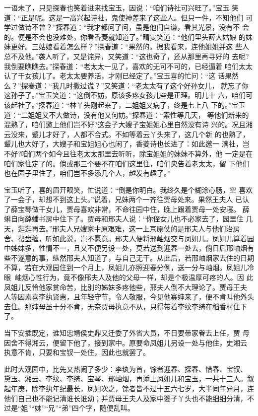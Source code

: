 一语未了，只见探春也笑着进来找宝玉，因说：“咱们诗社可兴旺了。”宝玉
笑道：“正是呢。这是一高兴起诗社，鬼使神差来了这些人。但只一件，不知他们
可学过做诗不曾？”探春道：“我才都问了问，虽是他们自谦，看其光景，没有不
会的。便是不会也没难处，你看香菱就知道了。”晴雯笑道：“他们里头薛大姑娘
的妹妹更好。三姑娘看着怎么样？”探春道：“果然的。据我看来，连他姐姐并这
些人总不及他。”袭人听了，又是诧异，又笑道：“这也奇了，还从那里再寻好的
去呢?我倒要瞧瞧去。”探春道：“老太太一见了，喜欢的无可不可的，已经逼着
咱们太太认了干女孩儿了。老太太要养活，才刚已经定了。”宝玉喜的忙问：“这
话果然么？”探春道：“我几时撒过谎？”又笑道：“老太太有了这个好孙女儿，
就忘了你这孙子了。”宝玉笑道：“这倒不妨，原该多疼女孩儿些是正理。明儿十
六，咱们可该起社了。”探春道：“林丫头刚起来了，二姐姐又病了，终是七上八
下的。”宝玉道：“二姐姐又不大做诗，没有他又何妨。”探春道：“索性等几天，
等他们新来的混熟了，咱们邀上他们岂不好?这会子大嫂子宝姐姐心里自然没有诗
兴的。况且湘云没来，颦儿才好了，人都不合式。不如等着云丫头来了，这几个新
的也熟了，颦儿也大好了，大嫂子和宝姐姐心也闲了，香菱诗也长进了：如此邀一
满社，岂不好?咱们两个如今且往老太太那里去听听，除宝姐姐的妹妹不算外，他
一定是在咱们家住定了的。倘或那三个要不在咱们这里住，咱们央告着老太太，留
下他们也在园子里住了，咱们岂不多添几个人，越发有趣了。”

宝玉听了，喜的眉开眼笑，忙说道：“倒是你明白。我终久是个糊涂心肠，空
喜欢了一会子，却想不到这上头。”说着，兄妹两个一齐往贾母处来。果然王夫人
已认了薛宝琴做干女儿，贾母喜欢非常，不命往园中住，晚上跟着贾母一处安寝。
薛蝌自向薛蟠书房中住下了。贾母和邢夫人说：“你侄女儿也不必家去了，园里住
几天，逛逛再去。”邢夫人兄嫂家中原艰难，这一上京原仗的是邢夫人与他们治房
舍、帮盘缠，听如此说，岂不愿意。邢夫人便将邢岫烟交与凤姐儿。凤姐儿算着园
中姊妹多，性情不一，且又不便另设一处，莫若送到迎春一处去，倘日后邢岫烟有
些不遂意的事，纵然邢夫人知道了，与自己无干。从此后，若邢岫烟家去住的日期
不算，若在大观园住到一个月上，凤姐儿亦照迎春分例，送一分与岫烟。凤姐儿冷
眼岫烟心性行为，竟不像邢夫人及他的父母一样，却是个极温厚可疼的人。因
此凤姐儿反怜他家贫命苦，比别的姊妹多疼他些，邢夫人倒不大理论了。贾母王夫
人等因素喜李纨贤惠，且年轻守节，令人敬服，今见他寡婶来了，便不肯叫他外头
去住。那婶母虽十分不肯，无奈贾母执意不从，只得带着李纹李绮在稻香村住下了。

当下安插既定，谁知忠靖侯史鼎又迁委了外省大员，不日要带家眷去上任，贾
母因舍不得湘云，便留下他了，接到家中。原要命凤姐儿另设一处与他住，史湘云
执意不肯，只要和宝钗一处住，因此也就罢了。

此时大观园中，比先又热闹了多少：李纨为首，馀者迎春、探春、惜春、宝钗、
黛玉、湘云、李纹、李绮、宝琴、邢岫烟，再添上凤姐儿和宝玉，一共十三人。叙
起年庚，除李纨年纪最长，凤姐次之，馀者皆不过十五六七岁，大半同年异月，连
他们自己也不能记清谁长谁幼；并贾母王夫人及家中婆子丫头也不能细细分清，不
过是“姐”“妹”“兄”“弟”四个字，随便乱叫。

